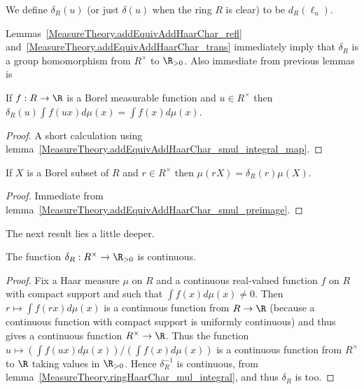 \begin{definition}
  \label{MeasureTheory.ringHaarChar}
  \leanok
  We define $\delta_R(u)$ (or just $\delta(u)$ when the ring $R$ is clear) to be $d_R(\ell_u)$.
\end{definition}

Lemmas~\ref{MeasureTheory.addEquivAddHaarChar_refl}
and~\ref{MeasureTheory.addEquivAddHaarChar_trans} immediately imply that $\delta_R$ is a group
homomorphism from $R^\times$ to $\R_{>0}$.
Also immediate from previous lemmas is

\begin{lemma}
  \label{MeasureTheory.ringHaarChar_mul_integral}
  \leanok
  If $f:R\to\R$ is a Borel measurable function and $u\in R^\times$ then
  $\delta_R(u)\int f(ux)d\mu(x)=\int f(x)d\mu(x)$.
\end{lemma}
\begin{proof}
  \leanok
  A short calculation using lemma~\ref{MeasureTheory.addEquivAddHaarChar_smul_integral_map}.
\end{proof}

\begin{lemma}
  \label{MeasureTheory.ringHaarChar_mul_volume}
  \leanok
  If $X$ is a Borel subset of $R$ and $r\in R^\times$ then $\mu(rX)=\delta_R(r)\mu(X)$.
\end{lemma}
\begin{proof}
  \leanok
   Immediate from lemma~\ref{MeasureTheory.addEquivAddHaarChar_smul_preimage}.
\end{proof}

The next result lies a little deeper.

\begin{corollary}
  \label{MeasureTheory.ringHaarChar_continuous}
  \leanok
  The function $\delta_R:R^\times\to\R_{>0}$ is continuous.
\end{corollary}
\begin{proof}
  \leanok
  Fix a Haar measure $\mu$ on $R$ and a continuous real-valued function
  $f$ on $R$ with compact support and such that $\int f(x) d\mu(x)\not=0$.
  Then $r \mapsto \int f(rx) d\mu(x)$ is a continuous function
  from $R\to\R$ (because a continuous function with compact support is uniformly
   continuous) and thus gives a continuous function $R^\times\to\R$.
   Thus the function $u\mapsto (\int f(ux) d\mu(x))/(\int f(x)d\mu(x))$ is
   a continuous function from $R^\times$ to $\R$ taking values in $\R_{>0}$.
   Hence $\delta_R^{-1}$ is continuous,
   from lemma~\ref{MeasureTheory.ringHaarChar_mul_integral},
   and thus $\delta_R$ is too.
\end{proof}

